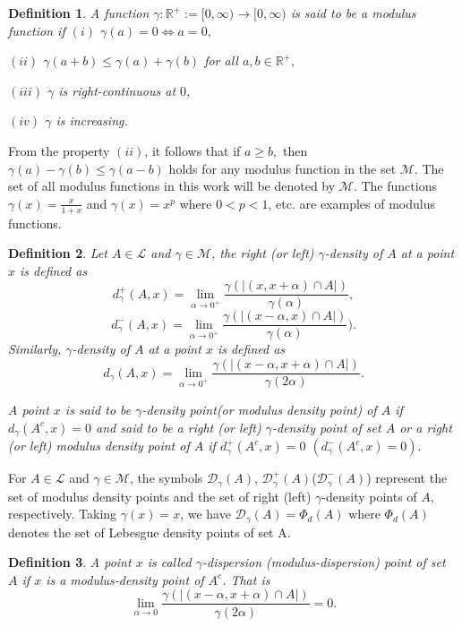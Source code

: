 \documentclass{amsart}
\theoremstyle{plain}
\newtheorem{definition}{Definition}
\numberwithin{equation}{section}
\begin{document}
 

\begin{definition}\cite{AP}
    A function $\gamma : \mathbb{R}^+:=[0,\infty)\to [0,\infty)$ is said to be a modulus function if
$(i)$ $\gamma(a)=0 \Leftrightarrow a=0,$
    
$(ii)$ $\gamma(a+b)\leq \gamma(a)+\gamma (b)$ for all $ a,b\in \mathbb{R}^+,$
        
$(iii)$ $\gamma$ is right-continuous at $0$,  
       
$(iv)$ $\gamma$ is increasing.
\end{definition}
 
From the property $(ii)$, it follows that if $a\geq b,$ then $\gamma(a)-\gamma (b)\leq \gamma(a-b)$ holds for any modulus function in the set  $\mathcal{M}$.
The set of all modulus functions in this work will be  denoted by $\mathcal{M}$.
The functions $\gamma(x)=\frac{x}{1+x}$  and $\gamma(x)=x^p$ where $0 < p < 1$, etc. are examples of modulus functions.
\begin{definition}
    Let $A\in \mathcal{L}$ and $\gamma \in \mathcal{M}$, the right (or left) $\gamma$-density of $A$ at a point $x$ is defined as $$d_{\gamma}^+(A,x)=\lim_{\alpha \to 0^+}\frac{\gamma(|(x,x+\alpha)\cap A|)}{\gamma(\alpha)},$$ $$ d_{\gamma}^-(A,x)=\lim_{\alpha \to 0^+}\frac{\gamma(|(x-\alpha,x)\cap A|)}{\gamma(\alpha)}).$$
    Similarly,  $\gamma$-density of $A$ at a point $x$ is defined as $$d_{\gamma}(A,x)=\lim_{\alpha \to 0^+}\frac{\gamma(|(x-\alpha,x+\alpha)\cap A|)}{\gamma(2\alpha)}.$$
   
    A point $x$ is said to be $\gamma$-density point(or modulus density point) of $A$  if $d_{\gamma}(A^c,x)=0$ and 
     said to be a right (or left) $\gamma$-density point of set $A$ or a right (or left) modulus density point of $A$ if $d_{\gamma}^+(A^c,x)=0$ $ 
     ( d_{\gamma}^-(A^c,x)=0).$
     \end{definition}
     
   For $A\in \mathcal{L}$ and $\gamma \in \mathcal{M}$, the symbols $\mathcal{D}_{\gamma}(A)$,  $\mathcal{D}_{\gamma}^+(A)$($\mathcal{D}_{\gamma}^-(A)$) represent  the set of modulus density points and the set of right (left) $\gamma$-density points of $A$, respectively. 
   Taking $\gamma(x)=x$, we have $\mathcal{D}_{\gamma}(A)=\Phi_d(A)$
    where $\Phi_d(A)$ denotes the set of Lebesgue density points of set A.
\begin{definition}
A point $x$ is called $\gamma$-dispersion (modulus-dispersion) point of set $A$ if $x$ is a modulus-density point of $A^c$. That is
    $$\lim_{\alpha \to 0}\frac{\gamma(|(x-\alpha,x+\alpha)\cap A|)}{\gamma(2\alpha)}=0.$$
\end{definition}
\end{document}
